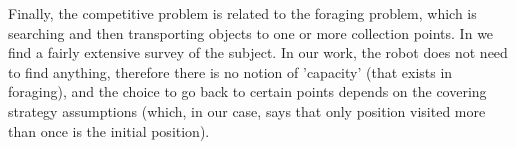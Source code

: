 Finally, the competitive problem is related to the foraging problem, which is searching and then transporting objects to one or more collection points. In \cite{winfield2009foraging} we find a fairly extensive survey of the subject. In our work, the robot does not need to find anything, therefore there is no notion of 'capacity' (that exists in foraging), and the choice to go back to certain points depends on the covering strategy assumptions (which, in our case, says that only position visited more than once is the initial position).